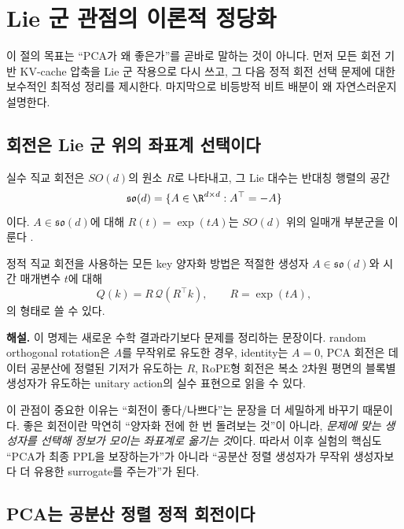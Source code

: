 \section{Lie 군 관점의 이론적 정당화}

이 절의 목표는 ``PCA가 왜 좋은가''를 곧바로 말하는 것이 아니다. 먼저 모든 회전 기반 KV-cache 압축을 Lie 군 작용으로 다시 쓰고, 그 다음 정적 회전 선택 문제에 대한 보수적인 최적성 정리를 제시한다. 마지막으로 비등방적 비트 배분이 왜 자연스러운지 설명한다.

\subsection{회전은 Lie 군 위의 좌표계 선택이다}

\begin{definition}[회전 생성자]
\label{def:generator}
실수 직교 회전은 $SO(d)$의 원소 $R$로 나타내고, 그 Lie 대수는 반대칭 행렬의 공간
\[
\mathfrak{so}(d)=\{A \in \R^{d \times d}: A^\top=-A\}
\]
이다. $A \in \mathfrak{so}(d)$에 대해 $R(t)=\exp(tA)$는 $SO(d)$ 위의 일매개 부분군을 이룬다 \citep{hall2015lie}.
\end{definition}

\begin{proposition}[회전 기반 방법의 공통 형식]
\label{prop:common_form}
정적 직교 회전을 사용하는 모든 key 양자화 방법은 적절한 생성자 $A \in \mathfrak{so}(d)$와 시간 매개변수 $t$에 대해
\[
Q(k)=R\,\mathcal{Q}(R^\top k), \qquad R=\exp(tA),
\]
의 형태로 쓸 수 있다.
\end{proposition}

\begin{theorycomment}
\textbf{해설.} 이 명제는 새로운 수학 결과라기보다 문제를 정리하는 문장이다. random orthogonal rotation은 $A$를 무작위로 유도한 경우, identity는 $A=0$, PCA 회전은 데이터 공분산에 정렬된 기저가 유도하는 $R$, RoPE형 회전은 복소 2차원 평면의 블록별 생성자가 유도하는 unitary action의 실수 표현으로 읽을 수 있다.
\end{theorycomment}

이 관점이 중요한 이유는 ``회전이 좋다/나쁘다''는 문장을 더 세밀하게 바꾸기 때문이다. 좋은 회전이란 막연히 ``양자화 전에 한 번 돌려보는 것''이 아니라, \emph{문제에 맞는 생성자를 선택해 정보가 모이는 좌표계로 옮기는 것}이다. 따라서 이후 실험의 핵심도 ``PCA가 최종 PPL을 보장하는가''가 아니라 ``공분산 정렬 생성자가 무작위 생성자보다 더 유용한 surrogate를 주는가''가 된다.

\subsection{PCA는 공분산 정렬 정적 회전이다}

